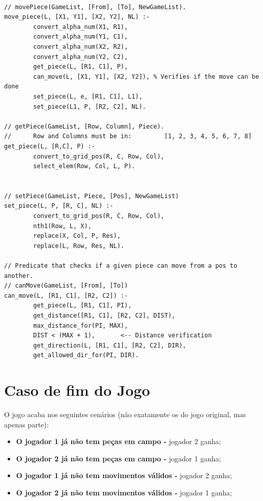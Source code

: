 \begin{lstlisting}

// movePiece(GameList, [From], [To], NewGameList).
move_piece(L, [X1, Y1], [X2, Y2], NL) :-
        convert_alpha_num(X1, R1),
        convert_alpha_num(Y1, C1),
        convert_alpha_num(X2, R2),
        convert_alpha_num(Y2, C2),
        get_piece(L, [R1, C1], P),
        can_move(L, [X1, Y1], [X2, Y2]), % Verifies if the move can be done
        set_piece(L, e, [R1, C1], L1),
        set_piece(L1, P, [R2, C2], NL).

// getPiece(GameList, [Row, Column], Piece).
//      Row and Columns must be in:         [1, 2, 3, 4, 5, 6, 7, 8]
get_piece(L, [R,C], P) :-
        convert_to_grid_pos(R, C, Row, Col),
        select_elem(Row, Col, L, P).


// setPiece(GameList, Piece, [Pos], NewGameList)
set_piece(L, P, [R, C], NL) :-
        convert_to_grid_pos(R, C, Row, Col),
        nth1(Row, L, X),
        replace(X, Col, P, Res),
        replace(L, Row, Res, NL).

// Predicate that checks if a given piece can move from a pos to another.
// canMove(GameList, [From], [To])
can_move(L, [R1, C1], [R2, C2]) :-
        get_piece(L, [R1, C1], PI),
        get_distance([R1, C1], [R2, C2], DIST),
        max_distance_for(PI, MAX),
        DIST < (MAX + 1),       <-- Distance verification
        get_direction(L, [R1, C1], [R2, C2], DIR),
        get_allowed_dir_for(PI, DIR).

\end{lstlisting}

\newpage

\section{Caso de fim do Jogo}

O jogo acaba nos seguintes cenários (não exatamente os do jogo original, mas apenas parte):

\begin{itemize}
  \item{\textbf{O jogador 1 já não tem peças em campo -} jogador 2 ganha;}
  \item {\textbf{O jogador 2 já não tem peças em campo -} jogador 1 ganha;}
  \item{\textbf{O jogador 1 já não tem movimentos válidos -} jogador 2 ganha;}
  \item{\textbf{O jogador 2 já não tem movimentos válidos -} jogador 1 ganha;}
\end{itemize}

